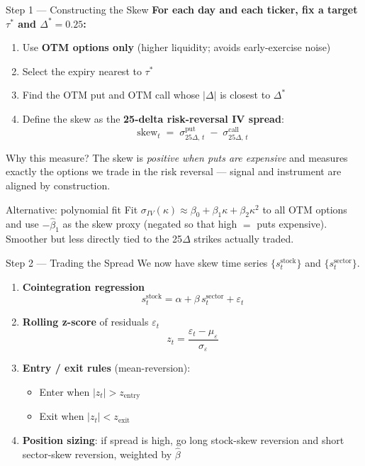 \documentclass{beamer}
\begin{document}
\begin{frame}{Step 1 --- Constructing the Skew}
  \textbf{For each day and each ticker, fix a target $\tau^*$ and $\Delta^* = 0.25$:}
  \vspace{0.4em}
  \begin{enumerate}
    \item Use \textbf{OTM options only} (higher liquidity; avoids early-exercise noise)
    \item Select the expiry nearest to $\tau^*$
    \item Find the OTM put and OTM call whose $|\Delta|$ is closest to $\Delta^*$
    \item Define the skew as the \textbf{25-delta risk-reversal IV spread}:
    \[
      \text{skew}_t \;=\; \sigma^{\text{put}}_{25\Delta,\,t} \;-\; \sigma^{\text{call}}_{25\Delta,\,t}
    \]
  \end{enumerate}
  \vspace{0.2em}
  \begin{block}{Why this measure?}
    The skew is \emph{positive when puts are expensive} and measures exactly the
    options we trade in the risk reversal --- signal and instrument are aligned
    by construction.
  \end{block}
  \vspace{0.2em}
  \begin{alertblock}{Alternative: polynomial fit}
    Fit $\sigma_{IV}(\kappa) \approx \beta_0 + \beta_1\kappa + \beta_2\kappa^2$
    to all OTM options and use $-\hat\beta_1$ as the skew proxy
    (negated so that high $= $ puts expensive).
    Smoother but less directly tied to the 25$\Delta$ strikes actually traded.
  \end{alertblock}
\end{frame}

\begin{frame}{Step 2 --- Trading the Spread}
  We now have skew time series $\{s_t^{\text{stock}}\}$ and
  $\{s_t^{\text{sector}}\}$.
  \vspace{0.5em}
  \begin{enumerate}
    \item \textbf{Cointegration regression}
    \[
      s_t^{\text{stock}} = \alpha + \beta \, s_t^{\text{sector}} + \varepsilon_t
    \]
    \item \textbf{Rolling z-score} of residuals $\varepsilon_t$
    \[
      z_t = \frac{\varepsilon_t - \mu_{\varepsilon}}{\sigma_{\varepsilon}}
    \]
    \item \textbf{Entry / exit rules} (mean-reversion):
    \begin{itemize}
      \item Enter when $|z_t| > z_{\text{entry}}$
      \item Exit when $|z_t| < z_{\text{exit}}$
    \end{itemize}
    \item \textbf{Position sizing}: if spread is high, go long stock-skew
          reversion and short sector-skew reversion, weighted by $\hat\beta$
  \end{enumerate}
\end{frame}
\end{document}
